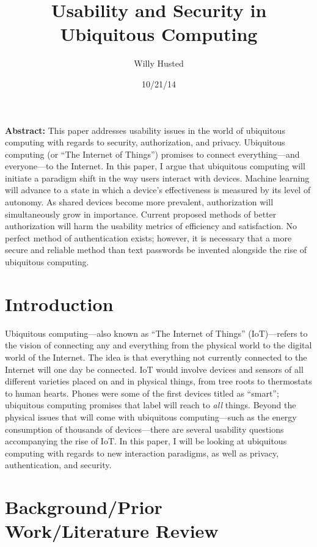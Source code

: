 \documentclass[11pt, oneside]{article}   	%
\title{Usability and Security in Ubiquitous Computing}
\author{Willy Husted}
\date{10/21/14}							%
\begin{document}
\maketitle
\textbf{Abstract:} This paper addresses usability issues in the world of ubiquitous computing with regards to security, authorization, and privacy. Ubiquitous computing (or ``The Internet of Things'') promises to connect everything---and everyone---to the Internet. In this paper, I argue that ubiquitous computing will initiate a paradigm shift in the way users interact with devices. Machine learning will advance to a state in which a device's effectiveness is measured by its level of autonomy. As shared devices become more prevalent, authorization will simultaneously grow in importance. Current proposed methods of better authorization will harm the usability metrics of efficiency and satisfaction. No perfect method of authentication exists; however, it is necessary that a more secure and reliable method than text passwords be invented alongside the rise of ubiquitous computing. 

\section{Introduction}
Ubiquitous computing---also known as ``The Internet of Things'' (IoT)---refers to the vision of connecting any and everything from the physical world to the digital world of the Internet. The idea is that everything not currently connected to the Internet will one day be connected. IoT would involve devices and sensors of all different varieties placed on and in physical things, from tree roots to thermostats to human hearts. Phones were some of the first devices titled as ``smart''; ubiquitous computing promises that label will reach to \textit{all} things. Beyond the physical issues that will come with ubiquitous computing---such as the energy consumption of thousands of devices---there are several usability questions accompanying the rise of IoT. In this paper, I will be looking at ubiquitous computing with regards to new interaction paradigms, as well as privacy, authentication, and security.

\section{Background/Prior Work/Literature Review}
\end{document}
